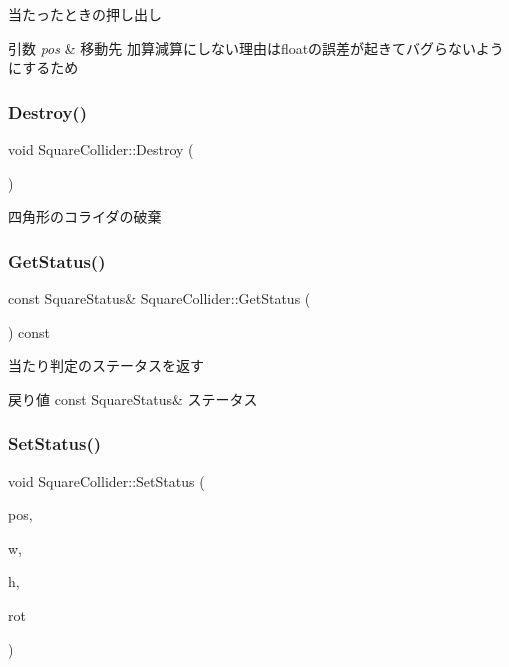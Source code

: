 当たったときの押し出し 


\begin{DoxyParams}{引数}
{\em pos} & 移動先  加算減算にしない理由はfloatの誤差が起きてバグらないようにするため \\
\hline
\end{DoxyParams}
\mbox{\label{class_square_collider_a83273e0e63692aa8020b8deedd456886}} 
\subsubsection{\texorpdfstring{Destroy()}{Destroy()}}
{\footnotesize\ttfamily void Square\+Collider\+::\+Destroy (\begin{DoxyParamCaption}{ }\end{DoxyParamCaption})}



四角形のコライダの破棄 

\mbox{\label{class_square_collider_ac437bc1bed951c82ca25d2b17a7b2e0f}} 
\subsubsection{\texorpdfstring{Get\+Status()}{GetStatus()}}
{\footnotesize\ttfamily const Square\+Status\& Square\+Collider\+::\+Get\+Status (\begin{DoxyParamCaption}{ }\end{DoxyParamCaption}) const\hspace{0.3cm}{\ttfamily [inline]}}



当たり判定のステータスを返す 

\begin{DoxyReturn}{戻り値}
const Square\+Status\& ステータス 
\end{DoxyReturn}
\mbox{\label{class_square_collider_ab5e57de1f1fddd5a6935e4ed8739b4b2}} 
\subsubsection{\texorpdfstring{Set\+Status()}{SetStatus()}}
{\footnotesize\ttfamily void Square\+Collider\+::\+Set\+Status (\begin{DoxyParamCaption}\item[{\mbox{\hyperlink{transform_8h_afb0c5e21d4133ff4f200992c0b534e1b}{V\+E\+C2}}}]{pos,  }\item[{float}]{w,  }\item[{float}]{h,  }\item[{float}]{rot }\end{DoxyParamCaption})}



